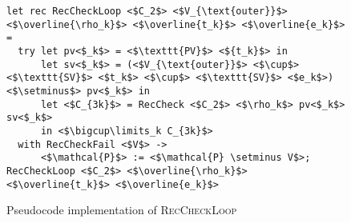 \begin{figure}
\centering
\small

\begin{verbatim}
let rec RecCheckLoop <$C_2$> <$V_{\text{outer}}$> <$\overline{\rho_k}$> <$\overline{t_k}$> <$\overline{e_k}$> =
  try let pv<$_k$> = <$\texttt{PV}$> <${t_k}$> in
      let sv<$_k$> = (<$V_{\text{outer}}$> <$\cup$> <$\texttt{SV}$> <$t_k$> <$\cup$> <$\texttt{SV}$> <$e_k$>) <$\setminus$> pv<$_k$> in
      let <$C_{3k}$> = RecCheck <$C_2$> <$\rho_k$> pv<$_k$> sv<$_k$>
      in <$\bigcup\limits_k C_{3k}$>
  with RecCheckFail <$V$> ->
      <$\mathcal{P}$> := <$\mathcal{P} \setminus V$>; RecCheckLoop <$C_2$> <$\overline{\rho_k}$> <$\overline{t_k}$> <$\overline{e_k}$>
\end{verbatim}

\caption{Pseudocode implementation of \textsc{RecCheckLoop}}
\label{fig:helpers}
\end{figure}
